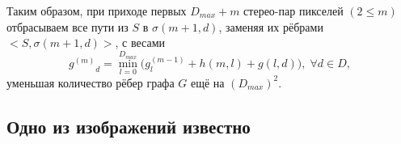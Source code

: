 Таким образом, при приходе первых $D_{max} + m$ стерео-пар пикселей $( 2 \leqslant m)$ отбрасываем все пути из $S$ в $\sigma(m+1, d)$, заменяя их рёбрами $<S, \sigma(m+1, d) >$, с весами 
$${g^{(m)}}_d = \min\limits_{l=0}^{D_{max}}{\big( g^{(m-1)}_l + h(m, l) + g(l, d) \big) },  \; \forall d \in D,$$
уменьшая количество рёбер графа $G$ ещё на $(D_{max})^2$.
\subsection{Одно из изображений известно}
